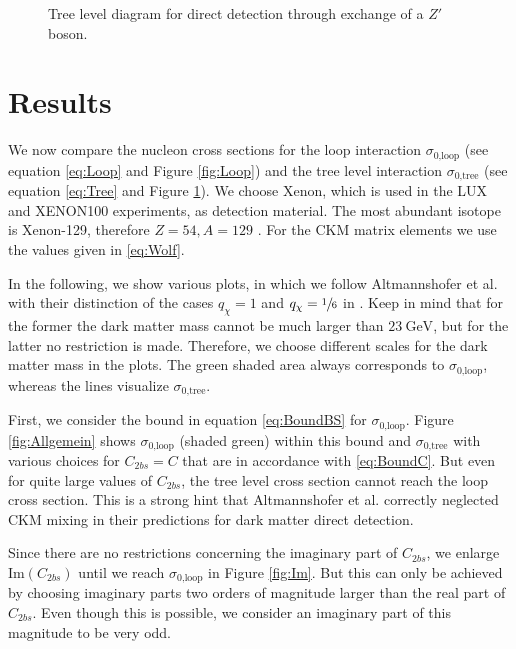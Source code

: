 \begin{figure}
	\centering
	\resizebox{.3\textwidth}{!}{
		
	}
	\caption{Tree level diagram for direct detection through exchange of a $Z'$ boson.}
	\label{fig:Tree}
\end{figure}

\section{Results}
We now compare the nucleon cross sections for the loop interaction $\sigma_\text{0,loop}$ (see equation \eqref{eq:Loop} and Figure \ref{fig:Loop}) and the tree level interaction $\sigma_\text{0,tree}$ (see equation \eqref{eq:Tree} and Figure \ref{fig:Tree}). We choose Xenon, which is used in the LUX and XENON100 experiments, as detection material. The most abundant isotope is Xenon-129, therefore $Z = 54, A=129$ \cite{DD}. For the CKM matrix elements we use the values given in \eqref{eq:Wolf}.


In the following, we show various plots, in which we follow Altmannshofer et al. with their distinction of the cases $q_\chi= 1$ and $q_\chi=\sfrac{1}{6}$ in \cite{Z}. Keep in mind that for the former the dark matter mass cannot be much larger than $\SI{23}{\giga\electronvolt}$, but for the latter no restriction is made. Therefore, we choose different scales for the dark matter mass in the plots. The green shaded area always corresponds to $\sigma_\text{0,loop}$, whereas the lines visualize $\sigma_\text{0,tree}$.


First, we consider the bound in equation \eqref{eq:BoundBS} for $\sigma_\text{0,loop}$. Figure \ref{fig:Allgemein} shows $\sigma_\text{0,loop}$ (shaded green) within this bound and $\sigma_\text{0,tree}$ with various choices for $C_{2bs} = C$ that are in accordance with \eqref{eq:BoundC}. But even for quite large values of $C_{2bs}$, the tree level cross section cannot reach the loop cross section. This is a strong hint that Altmannshofer et al. correctly neglected CKM mixing in their predictions for dark matter direct detection.


Since there are no restrictions concerning the imaginary part of $C_{2bs}$, we enlarge $\text{Im}(C_{2bs})$ until we reach $\sigma_\text{0,loop}$ in Figure \ref{fig:Im}. But this can only be achieved by choosing imaginary parts two orders of magnitude larger than the real part of $C_{2bs}$. Even though this is possible, we consider an imaginary part of this magnitude to be very odd.



